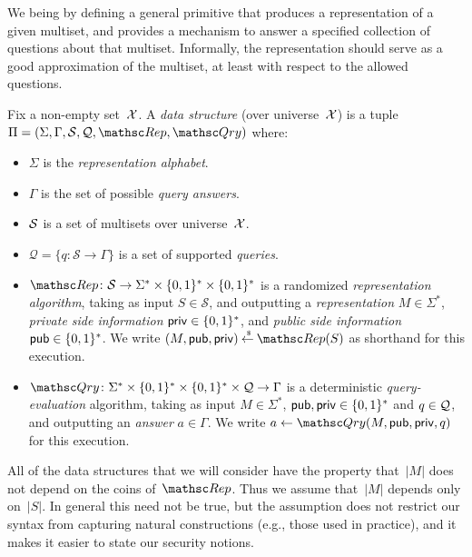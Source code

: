   We being by defining a general primitive
that produces a representation of a given multiset, and provides a
mechanism to answer a specified collection of questions about that
multiset.  Informally, the representation should serve as a good
approximation of the multiset, at least with respect to the allowed
questions.
\begin{definition} \rm
Fix a non-empty set~${\cal X}$. A \emph{data structure} (over universe~${\cal X}$)
is a tuple $\setprim=(\Sigma,\Gamma,\calS,\calQ,\Rep, \Qry)$ where:
\begin{itemize}
\item $\Sigma$ is the \emph{representation alphabet}.
\item $\Gamma$ is the set of possible \emph{query answers}.
\item ${\cal S}$ is a set  of multisets over universe~${\cal X}$.
\item $\mathcal{Q}=\{q \colon \mathcal{S} \to \Gamma\}$ is a set
    of supported \emph{queries}.
\item $\Rep \colon \mathcal{S} \to \Sigma^* \times \bits^*
    \times \bits^*$ is a randomized \emph{representation
    algorithm}, taking as input $S \in \mathcal{S}$, and
    outputting a \emph{representation} $M \in \Sigma^*$,
    \emph{private side information} ${\sf priv} \in \{0,1\}^*$, and
    \emph{public side information} ${\sf pub} \in \{0,1\}^*$.  We write
    $(M,\pubaux,\privaux) \getsr \Rep(S)$ as shorthand for this execution.
\item $\Qry\colon \Sigma^* \times \bits^* \times \bits^* \times \calQ \to
    \Gamma$ is a deterministic \emph{query-evaluation}
    algorithm, taking as input $M\in\Sigma^*$, ${\sf pub},{\sf priv} \in
    \{0,1\}^*$ and $q \in {\cal Q}$, and outputting
    an \emph{answer} $a \in \Gamma$.  We write $a \gets
    \Qry(M,\pubaux,\privaux,q)$ for this execution.
\end{itemize}
\hfill\dqed
\end{definition}
All of the data structures that
we will consider have the property that~$|M|$ does not depend on the
coins of~$\Rep$. Thus we assume that~$|M|$ depends only on~$|S|$. In
general this need not be true, but the assumption does not restrict
our syntax from capturing natural constructions (e.g., those used in
practice), and it makes it easier to state our security notions.

